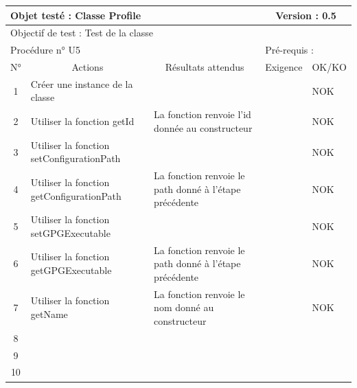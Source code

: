 \documentclass{../res/univ-projet}
\begin{document}
\begin{center}
    \begin{tabular}{|c|p{5cm}|p{5cm}|p{1.5cm}|p{1.5cm}|}
      \hline
      \multicolumn{3}{|l|}{Objet testé : Classe Profile} & \multicolumn{2}{c|}{Version : 0.5}\\ \hline
      \multicolumn{5}{|l|}{Objectif de test : Test de la classe}\\ \hline
      \multicolumn{3}{|l|}{Procédure n° U5} & \multicolumn{2}{p{3cm}|}{Pré-requis : }\\ \hline
      \multicolumn{1}{|c|}{N°} & \multicolumn{1}{c|}{Actions} & \multicolumn{1}{c|}{Résultats attendus} & 
      \multicolumn{1}{c|}{Exigence} & \multicolumn{1}{c|}{OK/KO}\\ \hline
      1 & Créer une instance de la classe &  &  & NOK \\
      2 & Utiliser la fonction getId & La fonction renvoie l'id donnée au constructeur &  & NOK \\
      3 & Utiliser la fonction setConfigurationPath &  &  & NOK \\
      4 & Utiliser la fonction getConfigurationPath & La fonction renvoie le path donné à l'étape précédente &  & NOK \\
      5 & Utiliser la fonction setGPGExecutable &  &  & NOK \\
      6 & Utiliser la fonction getGPGExecutable & La fonction renvoie le path donné à l'étape précédente &  & NOK \\
      7 & Utiliser la fonction getName & La fonction renvoie le nom donné au constructeur &  & NOK \\
      8 &  &  &  &  \\
      9 &  &  &  & \\
      10 &  &  &  &\\ 
  \hline
    \end{tabular}
    \vskip 2.2cm
    

\end{center}
\end{document}
